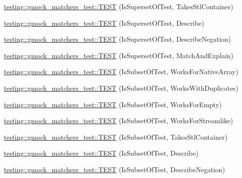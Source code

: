 \begin{DoxyCompactItemize}
\item 
\mbox{\hyperlink{namespacetesting_1_1gmock__matchers__test_a7f20d0da713270b05ac281034db4474d}{testing\+::gmock\+\_\+matchers\+\_\+test\+::\+T\+E\+ST}} (Is\+Superset\+Of\+Test, Takes\+Stl\+Container)
\item 
\mbox{\hyperlink{namespacetesting_1_1gmock__matchers__test_aa2c2618b90199acf6fbfd744ed4e06e6}{testing\+::gmock\+\_\+matchers\+\_\+test\+::\+T\+E\+ST}} (Is\+Superset\+Of\+Test, Describe)
\item 
\mbox{\hyperlink{namespacetesting_1_1gmock__matchers__test_adaaba3b4b2c1bdecc2cf6b2fda60e48f}{testing\+::gmock\+\_\+matchers\+\_\+test\+::\+T\+E\+ST}} (Is\+Superset\+Of\+Test, Describe\+Negation)
\item 
\mbox{\hyperlink{namespacetesting_1_1gmock__matchers__test_aa0e49e413718410f6c218a8cea29efb5}{testing\+::gmock\+\_\+matchers\+\_\+test\+::\+T\+E\+ST}} (Is\+Superset\+Of\+Test, Match\+And\+Explain)
\item 
\mbox{\hyperlink{namespacetesting_1_1gmock__matchers__test_ae0309b4aaaec67e3efd01102b13c17b7}{testing\+::gmock\+\_\+matchers\+\_\+test\+::\+T\+E\+ST}} (Is\+Subset\+Of\+Test, Works\+For\+Native\+Array)
\item 
\mbox{\hyperlink{namespacetesting_1_1gmock__matchers__test_a6a37363fe812ad8b04db69879edf19f8}{testing\+::gmock\+\_\+matchers\+\_\+test\+::\+T\+E\+ST}} (Is\+Subset\+Of\+Test, Works\+With\+Duplicates)
\item 
\mbox{\hyperlink{namespacetesting_1_1gmock__matchers__test_aa2cde172d990e3974d75ee1ccddef589}{testing\+::gmock\+\_\+matchers\+\_\+test\+::\+T\+E\+ST}} (Is\+Subset\+Of\+Test, Works\+For\+Empty)
\item 
\mbox{\hyperlink{namespacetesting_1_1gmock__matchers__test_a0c74e53d448fba1689bdf80d89306670}{testing\+::gmock\+\_\+matchers\+\_\+test\+::\+T\+E\+ST}} (Is\+Subset\+Of\+Test, Works\+For\+Streamlike)
\item 
\mbox{\hyperlink{namespacetesting_1_1gmock__matchers__test_aca8044618c61c7d814187623bc204a27}{testing\+::gmock\+\_\+matchers\+\_\+test\+::\+T\+E\+ST}} (Is\+Subset\+Of\+Test, Takes\+Stl\+Container)
\item 
\mbox{\hyperlink{namespacetesting_1_1gmock__matchers__test_a3fb89037795dbe77c5504d76064cedaf}{testing\+::gmock\+\_\+matchers\+\_\+test\+::\+T\+E\+ST}} (Is\+Subset\+Of\+Test, Describe)
\item 
\mbox{\hyperlink{namespacetesting_1_1gmock__matchers__test_a27188764d3036078c16d2efac0134e0b}{testing\+::gmock\+\_\+matchers\+\_\+test\+::\+T\+E\+ST}} (Is\+Subset\+Of\+Test, Describe\+Negation)

\end{DoxyCompactItemize}
